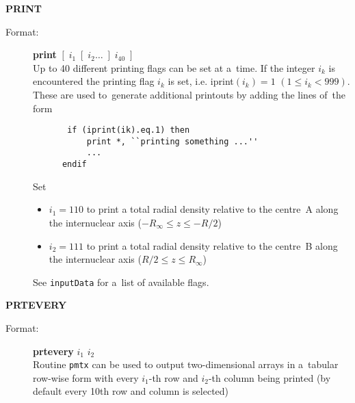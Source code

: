 \documentclass[12pt,a4paper]{article}
\newcommand{\ft}[1]{\texttt{#1}}
\begin{document}
\begin{description}
\item \textbf{PRINT} 
\begin{description} 
\item[Format:] \textbf{print} $[\; i_1 \; [\;i_2 \ldots \;] \;i_{40}\;]$ \\ Up to 40
  different printing flags can be set at a~time. If the integer $i_k$ is encountered the
  printing flag $i_k$ is set, i.e. iprint$(i_k)=1$ $(1 \leq i_k<999)$. These are used
  to~generate additional printouts by adding the lines of~the form
  \begin{verbatim} 
       if (iprint(ik).eq.1) then
           print *, ``printing something ...''
           ...
      endif
    \end{verbatim} 

Set
\begin{itemize} 
\item $i_1=110$ to print a total radial density relative to the
  centre~A along the internuclear axis ($-R_{\infty}\le z\le -R/2$)

\item $i_2=111$ to print a total radial density relative to the
  centre~B along the internuclear axis ($R/2\le z\le R_{\infty}$)
\end{itemize} 
See \ft{inputData} for a~list of available flags.

\end{description} 


\item \textbf{PRTEVERY} 
\begin{description} 
\item[Format:] \textbf{prtevery} $i_1$ $i_2$ \\ Routine \ft{pmtx} can be used to output
  two-dimensional arrays in a~tabular row-wise form with every $i_1$-th row and $i_2$-th
  column being printed (by default every 10th row and column is selected)
\end{description} 



\end{description}
\end{document}
